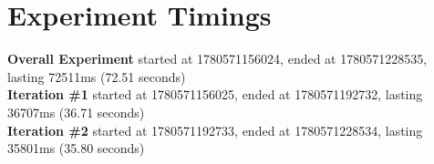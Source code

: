 \documentclass{article}
\begin{document}
\section*{Experiment Timings}
\textbf{Overall Experiment} started at 1780571156024, ended at 1780571228535, lasting 72511ms (72.51 seconds)
\\\textbf{Iteration \#1} started at 1780571156025, ended at 1780571192732, lasting 36707ms (36.71 seconds)
\\\textbf{Iteration \#2} started at 1780571192733, ended at 1780571228534, lasting 35801ms (35.80 seconds)
\end{document}
